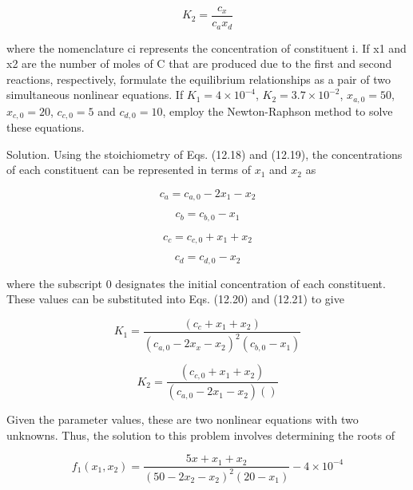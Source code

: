 \documentclass[../main.tex]{subfiles}
\begin{document}
\begin{equation}
K_{2}=\frac{c_{x}}{c_{a}x_{d}}
\tag{12.21}
\end{equation}

where the nomenclature ci represents the concentration of constituent i. If x1 and x2 are the
number of moles of C that are produced due to the first and second reactions, respectively,
formulate the equilibrium relationships as a pair of two simultaneous nonlinear equations.
If $K_{1}=4 \times 10^{-4}$, $K_{2}=3.7 \times10^{-2}$, $x_{a,0}=50$, $x_{c,0}=20$, $c_{c,0}=5$ and $c_{d,0}=10$, employ the
Newton-Raphson method to solve these equations.

Solution. Using the stoichiometry of Eqs. (12.18) and (12.19), the concentrations of
each constituent can be represented in terms of $x_{1}$ and $x_{2}$ as

\begin{equation}
c_{a}=c_{a,0}-2x_{1}-x_{2}
\tag{12.22}
\end{equation}

\begin{equation}
c_{b}=c_{b,0}-x_{1}
\tag{12.23}
\end{equation}

\begin{equation}
c_{c}=c_{c,0}+x_{1}+x_{2}
\tag{12.24}
\end{equation}

\begin{equation}
c_{d}=c_{d,0}-x_{2}
\tag{12.25}
\end{equation}

where the subscript 0 designates the initial concentration of each constituent. These values
can be substituted into Eqs. (12.20) and (12.21) to give

\begin{equation}
K_{1}=\frac{(c_{c}+x_{1}+x_{2})}{(c_{a,0}-2x_{x}-x_{2})^{2}(c_{b,0}-x_{1})}
\end{equation}

\begin{equation}
K_{2}=\frac{(c_{c,0}+x_{1}+x_{2})}{(c_{a,0}-2x_{1}-x_{2})()}
\end{equation}

Given the parameter values, these are two nonlinear equations with two unknowns. Thus,
the solution to this problem involves determining the roots of

\begin{equation}
f_{1}(x_{1},x_{2})=\frac{5x+x_{1}+x_{2}}{(50-2x_{2}-x_{2})^{2}(20-x_{1})}-4 \times 10^{-4}
\tag{12.27}
\end{equation}
\end{document}
